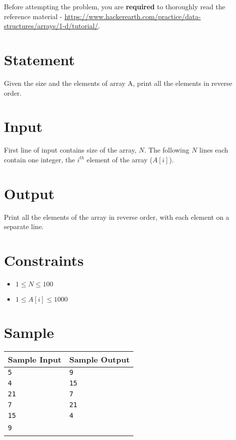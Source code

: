 \documentclass{article}
\begin{document}
Before attempting the problem, you are \textbf{required} to thoroughly read the reference material - \url{https://www.hackerearth.com/practice/data-structures/arrays/1-d/tutorial/}.

\section*{Statement}

Given the size and the elements of array A, print all the elements in reverse order.

\section*{Input}

First line of input contains size of the array, $N$. The following $N$ lines each contain one integer, the $i^{th}$ element of the array ($A[i]$).

\section*{Output}

Print all the elements of the array in reverse order, with each element on a separate line.

\section*{Constraints}

\begin{itemize}
    \item $1 \le N \le 100$
    \item $1 \le A[i] \le 1000$
\end{itemize}

\section*{Sample}

\begin{tabular}{l | l}
    \hline
    \hline
    Sample Input & Sample Output \\
    \hline
    \verb+5+ & \verb+9+ \\
    \verb+4+ & \verb+15+ \\
    \verb+21+ & \verb+7+ \\
    \verb+7+ & \verb+21+ \\
    \verb+15+ & \verb+4+ \\
    \verb+9+ & \ \\
    \hline
\end{tabular}
\end{document}
